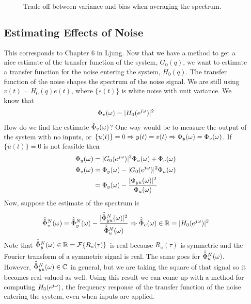 \begin{figure}[ht!]
  \centering
   \hfill
   \hfill
  \caption{Trade-off between variance and bias when averaging the spectrum.}
  \label{fig:07tradeoff}
\end{figure}

\subsection{Estimating Effects of Noise}
This corresponds to Chapter 6 in Ljung. Now that we have a method to get a nice estimate of the transfer function of the system, $G_0(q)$, we want to estimate a transfer function for the noise entering the system, $H_0(q)$. The transfer function of the noise shapes the spectrum of the noise signal. We are still using $v(t) = H_0(q)e(t)$, where $\{e(t)\}$ is white noise with unit variance. We know that
$$\Phi_v(\omega) = |H_0(e^{j\omega})|^2$$
How do we find the estimate $\hat{\Phi}_v(\omega)$? One way would be to measure the output of the system with no inputs, or $\{u(t)\}=0 \Rightarrow y(t) = v(t) \Rightarrow \Phi_y(\omega) = \Phi_v(\omega)$. If $\{u(t)\}=0$ is not feasible then
\begin{align*}
\Phi_y(\omega) &= |G_0(e^{j\omega})|^2\Phi_u(\omega) + \Phi_v(\omega) \\
\Phi_v(\omega) &= \Phi_y(\omega) - |G_0(e^{j\omega})|^2\Phi_u(\omega) \\
&= \Phi_y(\omega) - \frac{|\Phi_{yu}(\omega)|^2}{\Phi_u(\omega)}
\end{align*}
Now, suppose the estimate of the spectrum is
\begin{align*}
\hat{\hat{\Phi}}_v^N(\omega) = \hat{\hat{\Phi}}_y^N(\omega) - \frac{|\hat{\hat{\Phi}}_{yu}^N(\omega)|^2}{\hat{\hat{\Phi}}_u^N(\omega)} \Rightarrow \hat{\hat{\Phi}}_v(\omega)\in\mathbb{R} = |H_0(e^{j\omega})|^2
\end{align*}
Note that $\hat{\hat{\Phi}}_y^N(\omega)\in\mathbb{R} = \mathcal{F}\{R_u(\tau)\}$ is real because $R_u(\tau)$ is symmetric and the Fourier transform of a symmetric signal is real. The same goes for $\hat{\hat{\Phi}}_u^N(\omega)$. However, $\hat{\hat{\Phi}}_{yu}^N(\omega)\in\mathbb{C}$ in general, but we are taking the square of that signal so it becomes real-valued as well. Using this result we can come up with a method for computing $H_0(e^{j\omega})$, the frequency response of the transfer function of the noise entering the system, even when inputs are applied.

